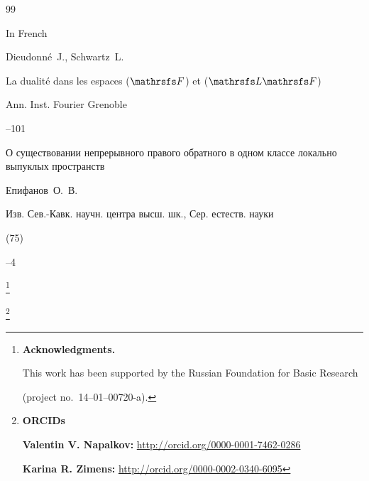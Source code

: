 \begin{thebibliography}{99}

\lang In French

\by Dieudonn\'e~J., Schwartz~L.

\paper La dualit\'e dans les espaces ($\mathrsfs F$) et ($\mathrsfs L \mathrsfs F$)



\jour  Ann. Inst. Fourier Grenoble 


--101 







\paper О существовании непрерывного правого обратного в одном классе локально выпуклых пространств

\by    Епифанов~О.~В.

\jour Изв. Сев.-Кавк. научн. центра высш. шк., Сер. естеств. науки


(75)

--4






\end{thebibliography}



\RuDate



\newpage

\makeentitle



\thanks{\textbf{Acknowledgments.} 

This work has been  supported by the Russian Foundation for Basic Research

 (project no.~14--01--00720-a).

}



\thanks{{\bf ORCIDs}



{\bf Valentin V. Napalkov:} \url{http://orcid.org/0000-0001-7462-0286}



{\bf Karina R. Zimens:} \url{http://orcid.org/0000-0002-0340-6095}





}



